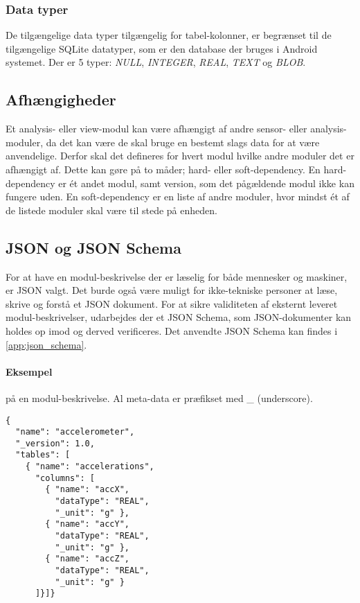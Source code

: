 \subsubsection{Data typer}
De tilgængelige data typer tilgængelig for tabel-kolonner, er begrænset til de tilgængelige SQLite datatyper, som er den database der bruges i Android systemet.
Der er 5 typer: \textit{NULL}, \textit{INTEGER}, \textit{REAL}, \textit{TEXT} og \textit{BLOB}.

\subsection{Afhængigheder}
Et analysis- eller view-modul kan være afhængigt af andre sensor- eller analysis-moduler, da det kan være de skal bruge en bestemt slags data for at være anvendelige.
Derfor skal det defineres for hvert modul hvilke andre moduler det er afhængigt af.
Dette kan gøre på to måder; hard- eller soft-dependency.
En hard-dependency er ét andet modul, samt version, som det pågældende modul ikke kan fungere uden.
En soft-dependency er en liste af andre moduler, hvor mindst ét af de listede moduler skal være til stede på enheden.

\subsection{JSON og JSON Schema}
For at have en modul-beskrivelse der er læselig for både mennesker og maskiner, er JSON valgt.
Det burde også være muligt for ikke-tekniske personer at læse, skrive og forstå et JSON dokument.
For at sikre validiteten af eksternt leveret modul-beskrivelser, udarbejdes der et JSON Schema, som JSON-dokumenter kan holdes op imod og derved verificeres.
Det anvendte JSON Schema kan findes i \cref{app:json_schema}.

\paragraph{Eksempel} på en modul-beskrivelse.
Al meta-data er præfikset med \_ (underscore).
\begin{lstlisting}
{
  "name": "accelerometer",
  "_version": 1.0,
  "tables": [
    { "name": "accelerations",
      "columns": [
        { "name": "accX",
          "dataType": "REAL",
          "_unit": "g" },
        { "name": "accY",
          "dataType": "REAL",
          "_unit": "g" },
        { "name": "accZ",
          "dataType": "REAL",
          "_unit": "g" }
      ]}]}
\end{lstlisting}

